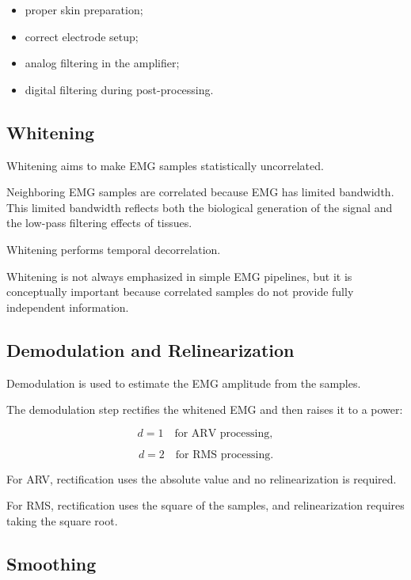 \begin{itemize}[noitemsep]
    \item proper skin preparation;
    \item correct electrode setup;
    \item analog filtering in the amplifier;
    \item digital filtering during post-processing.
\end{itemize}

\subsection{Whitening}

Whitening aims to make EMG samples statistically uncorrelated.

Neighboring EMG samples are correlated because EMG has limited bandwidth. This limited bandwidth reflects both the biological generation of the signal and the low-pass filtering effects of tissues.

Whitening performs temporal decorrelation.

\begin{authornote}
Whitening is not always emphasized in simple EMG pipelines, but it is conceptually important because correlated samples do not provide fully independent information.
\end{authornote}

\subsection{Demodulation and Relinearization}

Demodulation is used to estimate the EMG amplitude from the samples.

The demodulation step rectifies the whitened EMG and then raises it to a power:

\[
d = 1
\quad \text{for ARV processing},
\]

\[
d = 2
\quad \text{for RMS processing}.
\]

For ARV, rectification uses the absolute value and no relinearization is required.

For RMS, rectification uses the square of the samples, and relinearization requires taking the square root.

\subsection{Smoothing}

